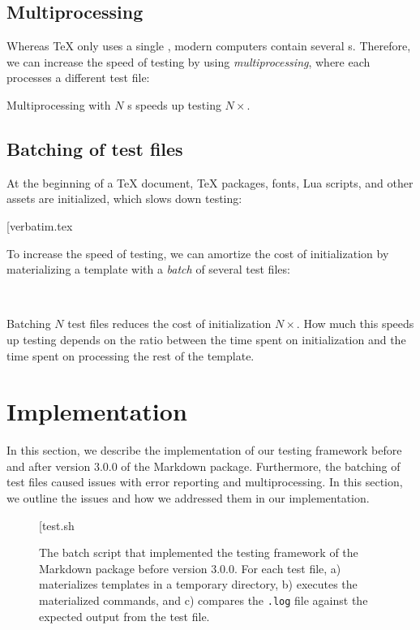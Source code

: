 \documentclass[final]{ltugboat}
\begin{document}
\subsection{Multiprocessing}
\label{sec:multiprocessing}
Whereas \TeX{} only uses a single , modern computers contain several s. Therefore, we can increase the speed of testing by using \emph{multiprocessing}, where each  processes a different test file:

\smallskip
\noindent
\begingroup
\centering

\par
\endgroup

\smallskip
\noindent
Multiprocessing with $N$ s speeds up testing $N\times$.

\subsection{Batching of test files}
\label{sec:batching-of-test-files}
At the beginning of a \TeX{} document, \TeX{} packages, fonts, Lua scripts, and other assets are initialized, which slows down testing:

\smallskip
\noindent
\example*[{verbatim.tex}

\smallskip

To increase the speed of testing, we can amortize the cost of initialization by materializing a template with a \emph{batch} of several test files:

\medskip
\noindent
{} \\

\smallskip
\noindent
Batching $N$ test files reduces the cost of initialization $N\times$. How much this speeds up testing depends on the ratio between the time spent on initialization and the time spent on processing the rest of the template.

\section{Implementation}
\label{sec:implementation}
In this section, we describe the implementation of our testing framework before and after version 3.0.0 of the Markdown package. Furthermore, the batching of test files caused issues with error reporting and multiprocessing. In this section, we outline the issues and how we addressed them in our implementation.

\begin{figure*}
\bigExample*[{test.sh}
\caption{The batch script  that implemented the testing framework of the Markdown package before version 3.0.0. For each test file,  a) materializes templates in a temporary directory, b) executes the materialized commands, and \linebreak c) compares the \texttt{.log} file against the expected output from the test file.}
\label{fig:test.sh}
\end{figure*}
\end{document}
